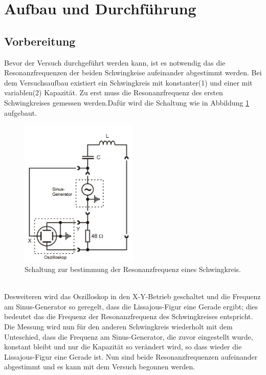 \section{Aufbau und Durchführung}
\label{sec:Durchführung}
 \subsection{Vorbereitung}
  \label{subsec:Vorbereitung}
Bevor der Versuch durchgeführt werden kann,
ist es notwendig das die Resonanzfrequenzen der
beiden Schwingkeise aufeinander abgestimmt werden.
Bei dem Versuchsaufbau existiert ein Schwingkreis
mit konstanter(1) und einer mit variablen(2) Kapazität.
Zu erst muss die Resonanzfrequenz des ersten
Schwingkreises gemessen werden.Dafür wird die Schaltung
wie in Abbildung \ref{abb:messungresonanz} aufgebaut.
\begin{figure}[h]
     \centering
     \includegraphics[width=0.5\textwidth]{resonanzbestimmung.PNG}
     \caption{Schaltung zur bestimmung der
     Resonanzfrequenz eines Schwingkreis.\cite{skript} }
     \label{abb:messungresonanz}
\end{figure}\\
Desweiteren wird das Oszilloskop in den X-Y-Betrieb geschaltet und
die Frequenz am Sinus-Generator so geregelt, dass die Lissajous-Figur
eine Gerade ergibt; dies bedeutet das die Frequenz der Resonanzfrequenz des
Schwingkreises entspricht. Die Messung wird nun für den anderen Schwingkreis wiederholt
mit dem Unteschied, dass die Frequenz am Sinus-Generator, die zuvor eingestellt wurde,
konstant bleibt und nur die Kapazität so verändert wird, so dass wieder die Lissajous-Figur
eine Gerade ist. Nun sind beide Resonanzfrequenzen aufeinander abgestimmt und es kann mit
dem Versuch begonnen werden.
